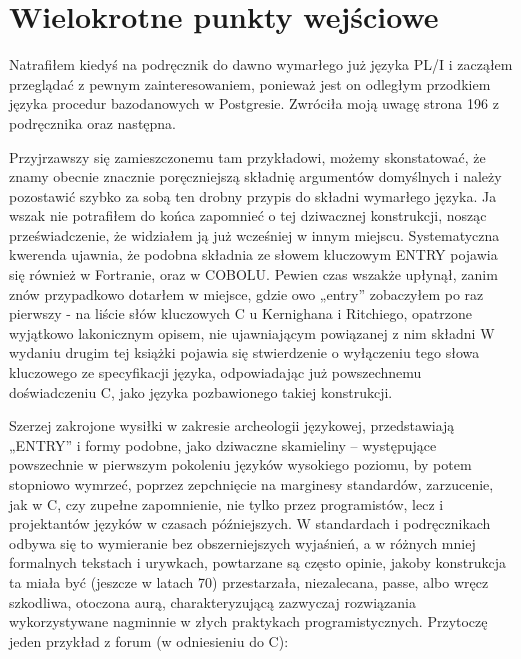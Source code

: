 \section{Wielokrotne punkty wejściowe}
Natrafiłem kiedyś na podręcznik do dawno wymarłego już języka PL/I i zacząłem przeglądać z pewnym zainteresowaniem, ponieważ jest on odległym przodkiem języka procedur bazodanowych w Postgresie. Zwróciła moją uwagę strona 196 z podręcznika\cite{plif} oraz następna.

Przyjrzawszy się zamieszczonemu tam przykładowi, możemy skonstatować, że znamy obecnie znacznie poręczniejszą składnię argumentów domyślnych i należy pozostawić szybko za sobą ten drobny przypis do składni wymarłego języka. Ja wszak nie potrafiłem do końca zapomnieć o tej dziwacznej konstrukcji, nosząc przeświadczenie, że widziałem ją już wcześniej w innym miejscu. Systematyczna kwerenda ujawnia, że podobna składnia ze słowem kluczowym ENTRY pojawia się również w Fortranie\cite[str.~120]{bielecki}, oraz w COBOLU\cite{ibm_manual_on_ENTRY_in_COBOL}. Pewien czas wszakże upłynął, zanim znów przypadkowo dotarłem w miejsce, gdzie owo „entry” zobaczyłem po raz pierwszy -  na liście słów kluczowych C u Kernighana i Ritchiego, opatrzone wyjątkowo lakonicznym opisem, nie ujawniającym powiązanej z nim składni\cite[str.~120]{KiR}
W wydaniu drugim tej książki pojawia się stwierdzenie o wyłączeniu tego słowa kluczowego ze specyfikacji języka\cite[rozdz.~A2.4,~str.192]{KiR2}, odpowiadając już powszechnemu doświadczeniu C, jako języka pozbawionego takiej konstrukcji.

Szerzej zakrojone wysiłki w zakresie archeologii językowej, przedstawiają „ENTRY” i formy podobne, jako dziwaczne skamieliny – występujące powszechnie w pierwszym pokoleniu języków wysokiego poziomu, by potem stopniowo wymrzeć, poprzez zepchnięcie na marginesy standardów, zarzucenie, jak w C, czy zupełne zapomnienie, nie tylko przez programistów, lecz i projektantów języków w czasach późniejszych. W standardach i podręcznikach odbywa się to wymieranie bez obszerniejszych wyjaśnień, a w różnych mniej formalnych tekstach i urywkach, powtarzane są często opinie, jakoby konstrukcja ta miała być (jeszcze w latach 70) przestarzała, niezalecana,  passe, albo wręcz szkodliwa, otoczona aurą, charakteryzującą zazwyczaj rozwiązania wykorzystywane nagminnie w złych praktykach programistycznych. Przytoczę jeden przykład z forum (w odniesieniu do C):

